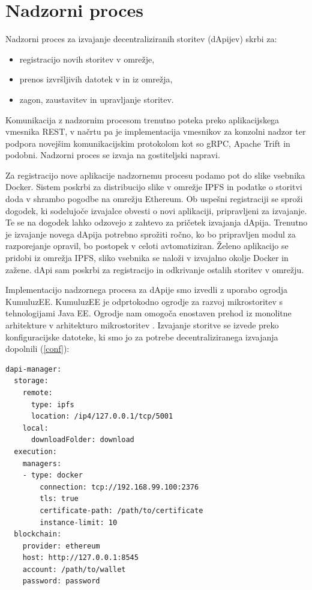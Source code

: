 \documentclass[a4paper, 12pt]{book}
\begin{document}
\section{Nadzorni proces}
Nadzorni proces za izvajanje decentraliziranih storitev (dApijev) skrbi za:
\begin{itemize}
	\item registracijo novih storitev v omrežje, 
	\item prenos izvršljivih datotek v in iz omrežja,
	\item zagon, zaustavitev in upravljanje storitev.
\end{itemize}

Komunikacija z nadzornim procesom trenutno poteka preko aplikacijskega vmesnika REST, v načrtu pa je implementacija vmesnikov za konzolni nadzor ter podpora novejšim komunikacijskim protokolom kot so gRPC, Apache Trift in podobni.
Nadzorni proces se izvaja na gostiteljski napravi.

Za registracijo nove aplikacije nadzornemu procesu podamo pot do slike vsebnika Docker.
Sistem poskrbi za distribucijo slike v omrežje IPFS in podatke o storitvi doda v shrambo pogodbe na omrežju Ethereum.
Ob uspešni registraciji se sproži dogodek, ki sodelujoče izvajalce obvesti o novi aplikaciji, pripravljeni za izvajanje.
Te se na dogodek lahko odzovejo z zahtevo za pričetek izvajanja dApija.
Trenutno je izvajanje novega dApija potrebno sprožiti ročno, ko bo pripravljen modul za razporejanje opravil, bo postopek v celoti avtomatiziran.
Želeno aplikacijo se pridobi iz omrežja IPFS, sliko vsebnika se naloži v izvajalno okolje Docker in zažene.
dApi sam poskrbi za registracijo in odkrivanje ostalih storitev v omrežju.

Implementacijo nadzornega procesa za dApije smo izvedli z uporabo ogro\-dja KumuluzEE.
KumuluzEE je odprtokodno ogrodje za razvoj mikrostoritev s tehnologijami Java EE.
Ogrodje nam omogoča enostaven prehod iz monolitne arhitekture v arhitekturo mikrostoritev \cite{kumuluzee}.
Izvajanje storitve se izvede preko konfiguracijske datoteke, ki smo jo za potrebe decentraliziranega izvajanja dopolnili (\ref{conf}):

\begin{lstlisting}[caption={Razširitev konfiguracijske datoteke},captionpos=b,label={conf}]
dapi-manager:
  storage:
    remote:
      type: ipfs
      location: /ip4/127.0.0.1/tcp/5001
    local:
      downloadFolder: download
  execution:
  	managers:
  	- type: docker
	    connection: tcp://192.168.99.100:2376
	    tls: true
	    certificate-path: /path/to/certificate
	    instance-limit: 10
  blockchain:
    provider: ethereum
    host: http://127.0.0.1:8545
    account: /path/to/wallet
    password: password
\end{lstlisting}
\end{document}

